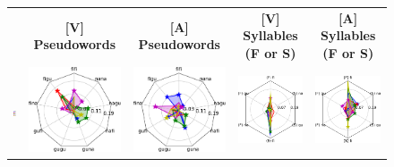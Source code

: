 \hspace{-5ex}
\begin{figure}[ht]
\scriptsize
\hspace{0ex}
\begin{tabular}{lcccc}
{} & \textbf{\Large [V] Pseudowords} & \textbf{\Large [A] Pseudowords} & \textbf{\Large [V] Syllables (F or S)} & \textbf{\Large [A] Syllables (F or S)}\\
\hspace{-4ex}
{\includegraphics[width=.07\linewidth]{figures/part_II/subjects_legend.pdf}}
\hspace{-4ex}
&{\includegraphics[width=.23\linewidth]{figures/part_II/roi_plots/pSTS/Vis/radial_word.pdf}}
\hspace{-4ex}
&{\includegraphics[width=.23\linewidth]{figures/part_II/roi_plots/pSTS/Aud/radial_word.pdf}}
\hspace{-4ex}
&{\includegraphics[width=.23\linewidth]{figures/part_II/roi_plots/pSTS/Vis/radial_joint.pdf}}
\hspace{-4ex}
&{\includegraphics[width=.23\linewidth]{figures/part_II/roi_plots/pSTS/Aud/radial_joint.pdf}}

\end{tabular}
\end{figure}
